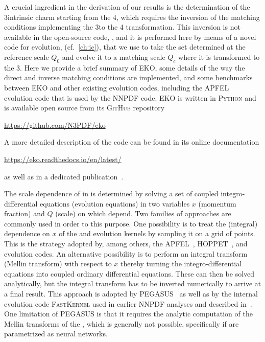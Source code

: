 
A crucial ingredient in the derivation of our results is the determination of
the 3\fns intrinsic charm \pdf starting from the 4\fns, which requires the
inversion of the matching conditions implementing the 3\fns to  the 4\fns
transformation.
%
This inversion is not available in the open-source \nnpdf code,
\cite{NNPDF:2021uiq}, and it is performed here by means of a novel code for \qcd
evolution, \eko (cf.\ \cref{ch:ic}), that we use to take the \pdf set
determined at the reference scale $Q_0$ and evolve it to a matching scale $Q_c$
where it is transformed to the 3\fns.
%
Here we provide a brief summary of \textsc{\small
EKO}, some details of the way the direct and inverse matching
conditions are implemented, and some benchmarks between \textsc{\small
EKO} and other existing \qcd evolution codes, including the  \textsc{\small
APFEL}~\cite{Bertone:2013vaa} evolution code that is used by the
NNPDF code.
\textsc{\small EKO} is written in \textsc{\small Python} and is available
open source from its \textsc{\small GitHub} repository
\begin{center}
\url{https://github.com/N3PDF/eko}
\end{center}
A more detailed description of the code can be found
in its online documentation
\begin{center}
\url{https://eko.readthedocs.io/en/latest/}
\end{center}
as well as in a dedicated publication~\cite{Candido:2022tld}.

The scale dependence of \pdfs in \qcd is determined by solving a set
of coupled integro-differential equations (evolution equations) in two
variables $x$ (momentum fraction) and $Q$ (scale) on which \pdfs depend.
Two families of approaches are commonly used in order to this purpose.
%
One possibility is to treat the (integral) dependence on $x$ of the
\pdfs and evolution kernels by
sampling it on a grid of points.
%
This is the strategy adopted by, among others, the  \textsc{\small APFEL}~\cite{Bertone:2013vaa},
\textsc{\small HOPPET}~\cite{Salam:2008qg},
and \textsc{\small \qcdNUM}~\cite{Botje:2010ay} evolution codes.
%
An alternative possibility is to perform an integral transform (Mellin
transform) with
respect to $x$ thereby turning the integro-differential equations into
coupled ordinary differential equations. These can then be solved
analytically, but the integral transform has to be inverted numerically
to arrive at a final result.
%
This approach is adopted by \textsc{\small PEGASUS}~\cite{pegasus} as well as by the
internal \pdf evolution code \textsc{\small FastKernel} used in earlier NNPDF analyses
and described in~\cite{DelDebbio:2007ee,Ball:2008by,Ball:2010de}.
%
One limitation of \textsc{\small PEGASUS} is that it requires the analytic
computation of the Mellin transforms of
the \pdfs, which is generally not possible, specifically if \pdfs are
parametrized as neural networks.
%


